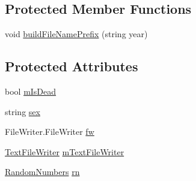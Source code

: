 \subsection*{Protected Member Functions}
\begin{DoxyCompactItemize}
\item 
void \hyperlink{class_p_a_z___dispersal_1_1_animal_aa499a801bd5c708653f744425d770326}{build\-File\-Name\-Prefix} (string year)
\end{DoxyCompactItemize}
\subsection*{Protected Attributes}
\begin{DoxyCompactItemize}
\item 
bool \hyperlink{class_p_a_z___dispersal_1_1_animal_a9449feb905213300ab7561b538045226}{m\-Is\-Dead}
\item 
string \hyperlink{class_p_a_z___dispersal_1_1_animal_a93b0c9ee51a31ce1ee9a1059a3382695}{sex}
\item 
File\-Writer.\-File\-Writer \hyperlink{class_p_a_z___dispersal_1_1_animal_a6b3d55044f533a214320e3d7cda53e1f}{fw}
\item 
\hyperlink{class_p_a_z___dispersal_1_1_text_file_writer}{Text\-File\-Writer} \hyperlink{class_p_a_z___dispersal_1_1_animal_a80f1bef34437deba0686ae9ecce2888d}{m\-Text\-File\-Writer}
\item 
\hyperlink{class_p_a_z___dispersal_1_1_random_numbers}{Random\-Numbers} \hyperlink{class_p_a_z___dispersal_1_1_animal_a85d08c4c6e9c53474fd15ab1d94f1531}{rn}
\end{DoxyCompactItemize}
